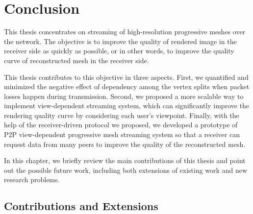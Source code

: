 \chapter{Conclusion}
\label{c:conclusion}
This thesis concentrates on streaming of high-resolution progressive meshes over the network. 
The objective is to improve the quality of rendered image in the receiver side
as quickly as possible, or in other words, to improve the quality curve of reconstructed mesh
in the receiver side. 

This thesis contributes to this objective in three aspects.
First, we quantified and minimized the negative effect of dependency
among the vertex splits when packet losses happen during transmission.
Second, we proposed a more scalable way to implement view-dependent streaming
system, which can significantly improve the rendering quality curve by considering 
each user's viewpoint. 
Finally, with the help of the receiver-driven protocol we proposed, we developed 
a prototype of P2P view-dependent progressive mesh streaming system so that
a receiver can request data from many peers to improve the quality of the reconstructed mesh.

In this chapter, we briefly review the main contributions of this thesis and point
out the possible future work, including both extensions of existing work and new research problems.

\section{Contributions and Extensions}
